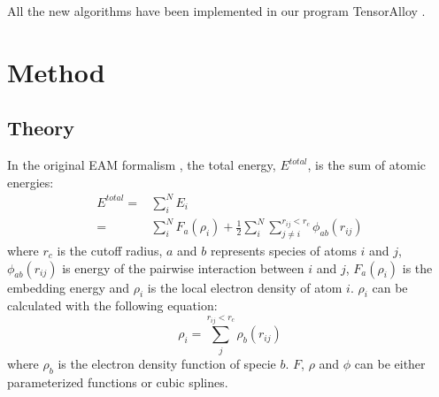 \documentclass[prb,reprint,superscriptaddress]{revtex4-2}
\begin{document}
All the new algorithms have been implemented in our program TensorAlloy 
\cite{TensorAlloy}.

% 
%
\section{Method}
\label{sec:method}


\subsection{Theory}
\label{sec:theory}

In the original EAM formalism \cite{EAM0}, the total energy, $E^{total}$, is the 
sum of atomic energies:
\begin{align}
E^{total} = & \sum_{i}^{N}{E_{i}} \nonumber \\
\label{eq:eam_total_energy}
= & \sum_{i}^{N}{F_{a}(\rho_i)} + 
    \frac{1}{2}\sum_{i}^{N}{\sum_{j \neq i}^{r_{ij} < r_c}{
    \phi_{ab}(r_{ij})
}}
\end{align}
where $r_c$ is the cutoff radius, $a$ and $b$ represents species of atoms $i$ 
and $j$, $\phi_{ab}(r_{ij})$ is energy of the pairwise interaction between $i$ 
and $j$, $F_{a}(\rho_{i})$ is the embedding energy and $\rho_{i}$ is the local 
electron density of atom $i$. $\rho_{i}$ can be calculated with the following 
equation:
\begin{equation}
\label{eq:rho_eam}
\rho_{i} = \sum_{j}^{r_{ij} < r_{c}}{
    \rho_{b}(r_{ij})
}
\end{equation}
where $\rho_{b}$ is the electron density function of specie $b$. 
$F$, $\rho$ and $\phi$ can be either parameterized functions or cubic splines.
\end{document}

